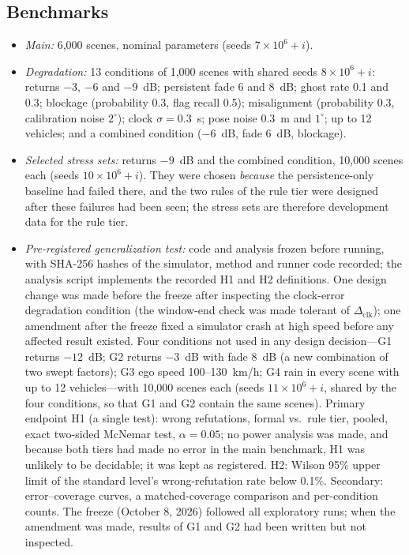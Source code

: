\subsection{Benchmarks}
\begin{itemize}
\item \emph{Main:} 6,000 scenes, nominal parameters (seeds \mbox{$7{\times}10^6{+}i$}).
\item \emph{Degradation:} 13 conditions of 1,000 scenes with shared seeds \mbox{$8{\times}10^6{+}i$}: returns $-3$, $-6$ and $-9$~dB; persistent fade 6 and 8~dB; ghost rate 0.1 and 0.3; blockage (probability 0.3, flag recall 0.5); misalignment (probability 0.3, calibration noise $2^\circ$); clock $\sigma = 0.3$~s; pose noise 0.3~m and $1^\circ$; up to 12 vehicles; and a combined condition ($-6$~dB, fade 6~dB, blockage).
\item \emph{Selected stress sets:} returns $-9$~dB and the combined condition, 10,000 scenes each (seeds \mbox{$10{\times}10^6{+}i$}). They were chosen \emph{because} the persistence-only baseline had failed there, and the two rules of the rule tier were designed after these failures had been seen; the stress sets are therefore development data for the rule tier.
\item \emph{Pre-registered generalization test:} code and analysis frozen before running, with SHA-256 hashes of the simulator, method and runner code recorded; the analysis script implements the recorded H1 and H2 definitions. One design change was made before the freeze after inspecting the clock-error degradation condition (the window-end check was made tolerant of $\Delta_{\mathrm{clk}}$); one amendment after the freeze fixed a simulator crash at high speed before any affected result existed. Four conditions not used in any design decision---G1 returns $-12$~dB; G2 returns $-3$~dB with fade 8~dB (a new combination of two swept factors); G3 ego speed 100--130~km/h; G4 rain in every scene with up to 12 vehicles---with 10,000 scenes each (seeds \mbox{$11{\times}10^6{+}i$}, shared by the four conditions, so that G1 and G2 contain the same scenes). Primary endpoint H1 (a single test): wrong refutations, formal vs.\ rule tier, pooled, exact two-sided McNemar test, $\alpha = 0.05$; no power analysis was made, and because both tiers had made no error in the main benchmark, H1 was unlikely to be decidable; it was kept as registered. H2: Wilson 95\% upper limit of the standard level's wrong-refutation rate below 0.1\%. Secondary: error--coverage curves, a matched-coverage comparison and per-condition counts. The freeze (October 8, 2026) followed all exploratory runs; when the amendment was made, results of G1 and G2 had been written but not inspected.

\end{itemize}
